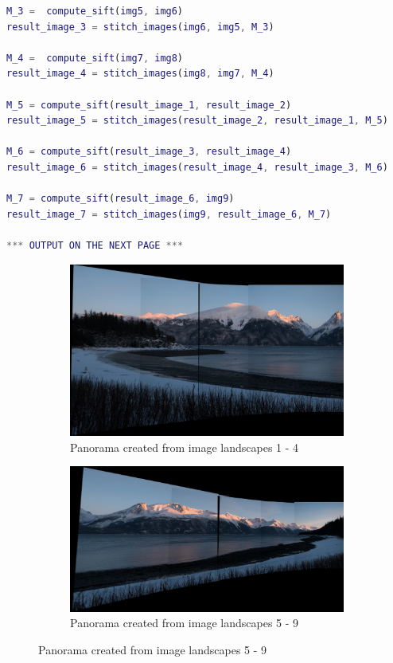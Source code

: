 \documentclass{csc_assignment4}
\begin{document}
\begin{description}
\begin{lstlisting}[language=MATLAB]
M_3 =  compute_sift(img5, img6)
result_image_3 = stitch_images(img6, img5, M_3)

M_4 =  compute_sift(img7, img8)
result_image_4 = stitch_images(img8, img7, M_4)

M_5 = compute_sift(result_image_1, result_image_2)
result_image_5 = stitch_images(result_image_2, result_image_1, M_5)

M_6 = compute_sift(result_image_3, result_image_4)
result_image_6 = stitch_images(result_image_4, result_image_3, M_6)

M_7 = compute_sift(result_image_6, img9)
result_image_7 = stitch_images(img9, result_image_6, M_7)

*** OUTPUT ON THE NEXT PAGE ***
\end{lstlisting}

\newpage
\begin{figure}[t!]
  \centering
  \begin{subfigure}[b]{0.8\linewidth}
    \includegraphics[width=\linewidth]{panorama_5.jpg}
    \caption{Panorama created from image landscapes 1 - 4}
  \end{subfigure}
  \begin{subfigure}[b]{0.8\linewidth}
    \includegraphics[width=\linewidth]{panorama_7.jpg}
    \caption{Panorama created from image landscapes 5 - 9}
  \end{subfigure}
\end{figure}

\clearpage
\end{description}
\end{document}
